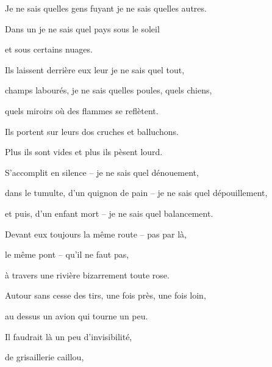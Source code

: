 
	{\setlength{\parskip}{0pt}%
	
Je ne sais quelles gens fuyant je ne sais quelles autres.
	
Dans un je ne sais quel pays sous le soleil

et sous certains nuages.

\bigskip

Ils laissent derrière eux leur je ne sais quel tout,

champs labourés, je ne sais quelles poules, quels chiens,

quels miroirs où des flammes se reflètent.

\bigskip

Ils portent sur leurs dos cruches et balluchons.

Plus ils sont vides et plus ils pèsent lourd.

\bigskip

S'accomplit en silence – je ne sais quel dénouement,

dans le tumulte, d'un quignon de pain – je ne sais quel dépouillement,

et puis, d'un enfant mort – je ne sais quel balancement.

\bigskip

Devant eux toujours la même route – pas par là,

le même pont – qu'il ne faut pas,

à travers une rivière bizarrement toute rose.

Autour sans cesse des tirs, une fois près, une fois loin,

au dessus un avion qui tourne un peu.

\bigskip

Il faudrait là un peu d'invisibilité,

de grisaillerie caillou,

}
